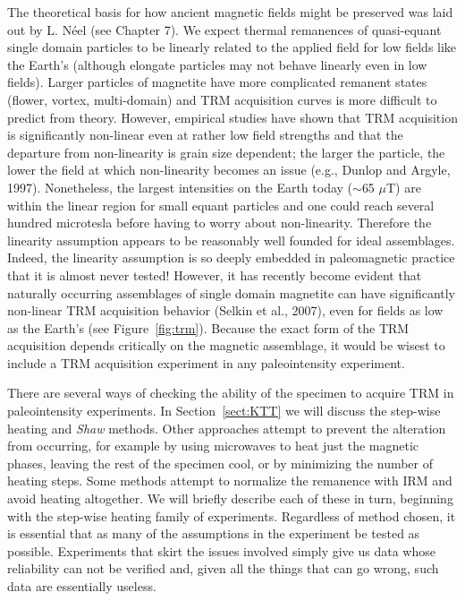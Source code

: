   The  theoretical basis for how ancient magnetic fields might be preserved was laid out by   L.  N\'eel  (see Chapter 7).  We expect thermal remanences of quasi-equant single domain particles  to be linearly related to the applied field for low fields like the Earth's (although elongate particles may not behave linearly even in low fields).    Larger particles of magnetite   have more complicated remanent states (flower, vortex, multi-domain)  and  TRM acquisition curves is more difficult to predict from theory.  However, empirical studies have shown that TRM acquisition is significantly  non-linear even at rather low field strengths and that the departure from non-linearity is grain size dependent; the larger the particle, the lower the field at which non-linearity becomes an issue  (e.g.,
Dunlop and Argyle,  1997).   \nocite{dunlop97b}   Nonetheless, the largest intensities on the Earth today ($\sim$65 $\mu$T) are within the linear region  for small equant particles and one could  reach several hundred microtesla before having to worry about non-linearity.    Therefore the linearity assumption  appears to be reasonably well founded for ideal assemblages.  Indeed, the linearity assumption is so deeply embedded in paleomagnetic practice that it is almost never tested! However,  it has recently become evident that naturally occurring assemblages of single domain magnetite can have significantly non-linear TRM acquisition behavior 
  (Selkin et al., 2007), \nocite{selkin07} even for fields as low as the  Earth's (see Figure~\ref{fig:trm}).  Because the exact form of the TRM acquisition depends critically on the magnetic assemblage,  it would be wisest to include a TRM acquisition experiment in any paleointensity experiment.  
  

There are several ways of checking the ability of the specimen to acquire TRM in paleointensity experiments.  In Section~\ref{sect:KTT}  we will discuss the
step-wise heating  and 
{\it Shaw} methods.   Other approaches attempt to prevent the alteration from occurring, for example by using microwaves to heat just the magnetic phases, leaving the rest of the specimen cool, or by minimizing the number of heating steps.  Some methods attempt to normalize the remanence with IRM and avoid heating altogether.  We will briefly describe each of these in turn, beginning with the step-wise heating family of experiments.   Regardless of method chosen,  it is essential that as many of the assumptions in the experiment be tested as possible.  Experiments that skirt the issues involved simply give us data whose reliability can not be verified and, given all the things that can go wrong, such data are essentially useless.   



